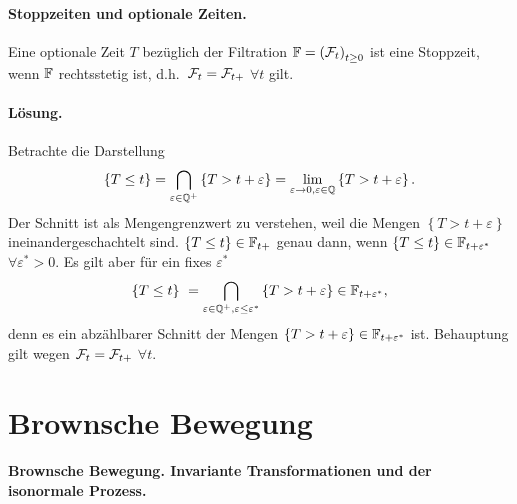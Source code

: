 \paragraph{Stoppzeiten und optionale Zeiten. } Eine optionale Zeit $T$ bezüglich
der Filtration $\mathbb F=\left( \mathcal F_t \right)_{t \geq 0}$ ist eine Stoppzeit, wenn 
$\mathbb F$ rechtsstetig ist, d.h.\ $\mathcal F_t=\mathcal F_{t+}$ $\forall t$ gilt.

\paragraph*{Lösung.}  Betrachte die Darstellung
\begin{eqnarray}
    \left\{ T \leq t \right\} = \bigcap_{\varepsilon\in\mathbb Q^{+}} \left\{ T > t+\varepsilon \right\}
    = \lim_{\varepsilon\to 0, \varepsilon\in\mathbb Q} \left\{ T > t+\varepsilon \right\}.
\end{eqnarray}
Der Schnitt ist als Mengengrenzwert zu verstehen, weil die Mengen $\left\{ T >
t+\varepsilon \right\}$ ineinandergeschachtelt sind. $\left\{ T \leq t \right\}\in \mathbb F_{t+}$
genau dann, wenn $\left\{ T \leq t \right\}\in \mathbb F_{t+\varepsilon^{*}}$ $\forall \varepsilon^{*}>0$.
Es gilt aber für ein fixes $\varepsilon^{*}$
\begin{equation}
    \left\{ T \leq t \right\}\ = 
    \bigcap_{\varepsilon\in\mathbb Q^{+}, \varepsilon\leq \varepsilon^{*}} \left\{ T > t+\varepsilon \right\} 
    \in\mathbb F_{t+\varepsilon^{*}},
\end{equation}
denn es ein abzählbarer Schnitt der Mengen $\left\{ T> t+\varepsilon
\right\}\in\mathbb F_{t+\varepsilon^{*}}$ ist. Behauptung gilt wegen $\mathcal F_t=\mathcal F_{t+}$ $\forall t$.


\section{Brownsche Bewegung}

\paragraph{Brownsche Bewegung. Invariante Transformationen und der isonormale Prozess.}


